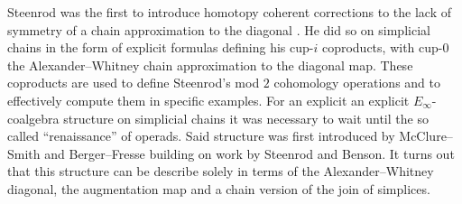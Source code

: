 Steenrod was the first to introduce homotopy coherent corrections to the lack of symmetry of a chain approximation to the diagonal \cite{steenrod1947products}.
He did so on simplicial chains in the form of explicit formulas defining his cup-$i$ coproducts, with \mbox{cup-$0$} the Alexander--Whitney chain approximation to the diagonal map.
These coproducts are used to define Steenrod's mod $2$ cohomology operations and to effectively compute them in specific examples.
For an explicit an explicit $E_\infty$-coalgebra structure on simplicial chains it was necessary to wait until the so called ``renaissance'' of operads.
Said structure was first introduced by McClure--Smith \cite{mcclure2003multivariable} and Berger--Fresse \cite{berger2004combinatorial} building on work by Steenrod and Benson.
It turns out that this structure can be describe solely in terms of the Alexander--Whitney diagonal, the augmentation map and a chain version of the join of simplices.

